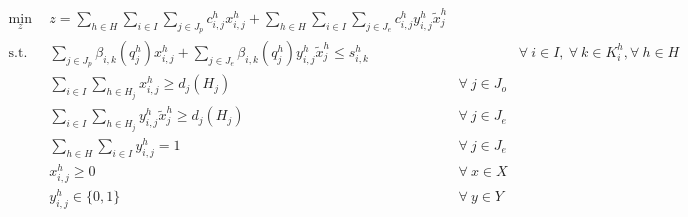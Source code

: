 \begin{subequations}\label{eqs:GFCTP-E}
  \begin{align}
    \label{eq:GRCTP-E_obj}
    \min_{z} \:\: 
    & 
    z = \sum_{h \in H}\sum_{i \in I}\sum_{j \in J_{p}}c_{i,j}^{h} x_{i,j}^{h} 
    + \sum_{h \in H}\sum_{i \in I}\sum_{j \in J_{e}}c_{i,j}^{h} y_{i,j}^{h} \tilde{x}_{j}^{h}
    && \\
    \label{eq:GRCTP-E_sup}
    \text{s.t.} \:\: 
    &
    \sum_{j \in J_{p}}\beta_{i,k}(q_{j}^{h}) x_{i,j}^{h}
    + \sum_{j \in J_{e}}\beta_{i,k}(q_{j}^{h}) y_{i,j}^{h} \tilde{x}_{j}^{h} \leq s_{i,k}^{h} 
    &&
    \forall \: i \in I, \: \forall \: k \in K_{i}^{h}, \forall \: {h \in H} \\
    \label{eq:GRCTP-E_dem_p}
    &
    \sum_{i \in I}\sum_{h \in H_{j}} x_{i,j}^{h} \geq d_{j}(H_{j}) 
    & 
    \forall \: j \in J_{o} &\\
    \label{eq:GRCTP-E_dem_e}
    &
    \sum_{i \in I}\sum_{h \in H_{j}} y_{i,j}^{h} \tilde{x}_{j}^{h} \geq d_{j}(H_{j}) 
    &
    \forall \: j \in J_{e}  &\\
    \label{eq:GRCTP-E_sumy}
    &
    \sum_{h \in H}\sum_{i \in I} y_{i,j}^{h} = 1
    &
    \forall \: j \in J_{e}  &\\
    \label{eq:GRCTP-E_x}
    &
    x_{i,j}^{h} \geq 0
    &
    \forall \: x \in X  &\\
    \label{eq:GRCTP-E_y}
    &
    y_{i,j}^{h} \in \{0,1\}
    &
    \forall \: y \in Y &
  \end{align}
\end{subequations}
